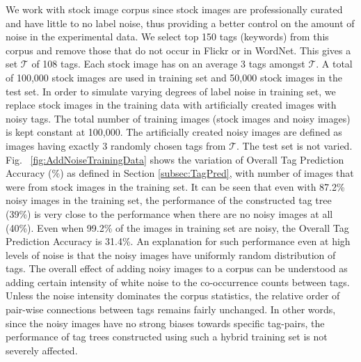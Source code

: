 We work with stock image corpus since stock images are professionally curated and have little to no label noise, thus providing a better control on the amount of noise in the experimental data. We select top 150 tags (keywords) from this corpus and remove those that do not occur in Flickr or in WordNet. This gives a set $\mathcal{T}$  of 108 tags. Each stock image has on an average 3 tags amongst $\mathcal{T}$. A total of 100,000 stock images are used in training set and 50,000 stock images in the test set. In order to simulate varying degrees of label noise in training set, we replace stock images in the training data with artificially created images with noisy tags. The total number of training images (stock images and noisy images) is kept constant at 100,000. The artificially created noisy images are defined as images having exactly 3 randomly chosen tags from $\mathcal{T}$. The test set is not varied.  Fig. ~\ref{fig:AddNoiseTrainingData} shows the variation of Overall Tag Prediction Accuracy (\%) as defined in Section \ref{subsec:TagPred}, with number of images that were from stock images in the training set. It can be seen that even with 87.2\% noisy images in the training set, the performance of the constructed tag tree (39\%) is very close to the performance when there are no noisy images at all (40\%). Even when 99.2\% of the images in training set are noisy, the Overall Tag Prediction Accuracy is 31.4\%. An explanation for such performance even at high levels of noise is that the noisy images have uniformly random distribution of tags. The overall effect of adding noisy images to a corpus can be understood as adding certain intensity of white noise to the co-occurrence counts between tags. Unless the noise intensity dominates the corpus statistics, the relative order of pair-wise connections between tags remains fairly unchanged. In other words, since the noisy images have no strong biases towards specific tag-pairs, the performance of tag trees constructed using such a hybrid training set is not severely affected. 

